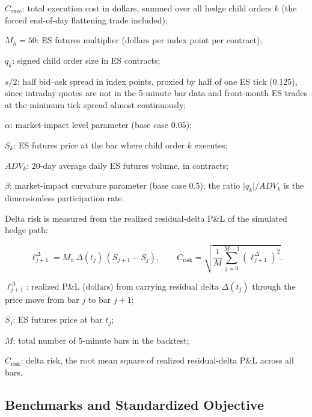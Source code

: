 \documentclass{article}
\begin{document}
\begin{vardefs}
\item $C_{\text{exec}}$: total execution cost in dollars, summed over all hedge child
  orders $k$ (the forced end-of-day flattening trade included);
\item $M_h = 50$: ES futures multiplier (dollars per index point per contract);
\item $q_k$: signed child order size in ES contracts;
\item $s/2$: half bid--ask spread in index points, proxied by half of one ES tick
  ($0.125$), since intraday quotes are not in the 5-minute bar data and front-month ES
  trades at the minimum tick spread almost continuously;
\item $\alpha$: market-impact level parameter (base case $0.05$);
\item $S_k$: ES futures price at the bar where child order $k$ executes;
\item $ADV_k$: 20-day average daily ES futures volume, in contracts;
\item $\beta$: market-impact curvature parameter (base case $0.5$); the ratio
  $\lvert q_k \rvert / ADV_k$ is the dimensionless participation rate.
\end{vardefs}

Delta risk is measured from the realized residual-delta P\&L of the simulated hedge
path:

\begin{eqbox}
\begin{equation}
\ell^{\Delta}_{j+1} = M_h\,\Delta(t_j)\,(S_{j+1} - S_j),
\qquad
C_{\text{risk}} = \sqrt{ \frac{1}{M} \sum_{j=0}^{M-1} \left( \ell^{\Delta}_{j+1} \right)^{2} }.
\end{equation}
\end{eqbox}

\begin{vardefs}
\item $\ell^{\Delta}_{j+1}$: realized P\&L (dollars) from carrying residual delta
  $\Delta(t_j)$ through the price move from bar $j$ to bar $j+1$;
\item $S_j$: ES futures price at bar $t_j$;
\item $M$: total number of 5-minute bars in the backtest;
\item $C_{\text{risk}}$: delta risk, the root mean square of realized residual-delta
  P\&L across all bars.
\end{vardefs}

\subsection{Benchmarks and Standardized Objective}
\end{document}
